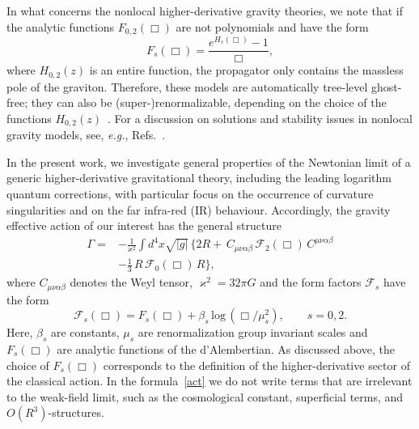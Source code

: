 \documentclass[aps,prd,a4paper,twocolumn,showpacs,showkeys,preprintnumbers,amsmath,amssymb,nofootinbib]{revtex4-2}
\numberwithin{equation}{section}
\def\beq{\begin{equation}}
\def\eeq{\end{equation}}
\def\ln{\,\mbox{log}\,}
\newcommand{\n}[1]{\label{#1}}
\def\al{\alpha}
\def\be{\beta}
\def\Ga{\Gamma}
\begin{document}
In what concerns the nonlocal higher-derivative gravity theories, we note that if the analytic functions $F_{0,2} (\Box)$ are not polynomials and have the form
\beq
\n{nonlocal}
F_s (\Box) = \frac{ e^{H_s(\Box)} - 1 } {\Box},
\eeq
where $H_{0,2}(z)$ is an entire function, the propagator only contains the massless pole of the graviton. Therefore, these models are automatically tree-level ghost-free; they can also be (super-)renormalizable, depending on the choice of the functions $H_{0,2}(z)$~\cite{Tomboulis,Modesto12}. For a discussion on solutions and stability issues in nonlocal gravity models, see, \textit{e.g.}, Refs.~\cite{Li:2015bqa,Calcagni:2010ab,Calcagni:2018pro,Calcagni:2017sov,Briscese:2019rii,Briscese:2018bny}.

In the present work, we investigate general properties of the Newtonian limit of a generic higher-derivative gravitational theory, including the leading logarithm quantum corrections, with particular focus on the occurrence of curvature singularities and on the far infra-red (IR) behaviour. Accordingly, the gravity effective action of our interest has the general structure
\begin{equation} 
\begin{split}
\label{act}
\Ga %
=  & - \frac{1}{\varkappa^2} \int d^4 x \sqrt{|g|} \,
\Big\{ 2  R 
 + \, C_{\mu\nu\al\be} \, \mathscr{F}_2(\Box) \, C^{\mu\nu\al\be}
\\
&
- \tfrac13 \, R \, \mathscr{F}_0 (\Box)  \, R
\Big\},
\end{split} 
\end{equation}
where $C_{\mu\nu\al\be}$ denotes the Weyl tensor, $\varkappa^2 =  32 \pi G$ and the form factors $\mathscr{F}_s$
have the form
%
\begin{equation} 
\label{FormFac}
\mathscr{F}_s (\Box) =  F_s(\Box) + \beta_s \ln ( \Box/\mu_s^2 ), \qquad s = 0,2 . 
\end{equation}
Here, $\beta_s$ are constants, $\mu_s$ are renormalization group invariant scales and $F_s (\Box)$ are analytic functions of the d'Alembertian. As discussed above, the choice of $F_s (\Box)$ corresponds to the definition of the higher-derivative sector of the classical action.
In the formula~\eqref{act} we do not write terms that are irrelevant to the weak-field limit, such as the cosmological constant, superficial terms, and $O(R^3)$-structures.
\end{document}
